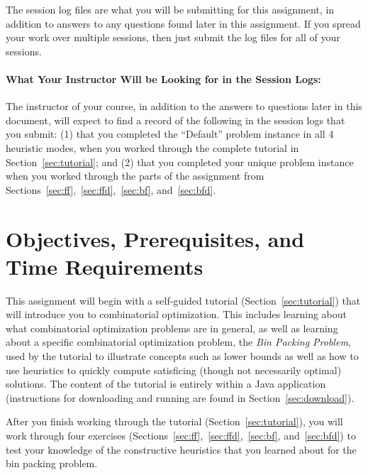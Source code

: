 \documentclass[11pt,letterpaper]{article}
\begin{document}
The session log files are what you will be submitting for this assignment,
in addition to answers to any questions found later in this assignment. If you
spread your work over multiple sessions, then just submit the log files for all
of your sessions.

\paragraph*{What Your Instructor Will be Looking for in the Session Logs:}
The instructor of your course, in addition to the answers to questions later in this
document, will expect to find a record of the following in the session logs that
you submit: (1) that you completed the ``Default'' problem instance in all 4
heuristic modes, when you worked through the complete tutorial in 
Section~\ref{sec:tutorial}; and (2) that you completed your unique problem instance
when you worked through the parts of the assignment from 
Sections~\ref{sec:ff},~\ref{sec:ffd},~\ref{sec:bf}, and~\ref{sec:bfd}.

\section{Objectives, Prerequisites, and Time Requirements}\label{sec:objectives}
This assignment will begin with a self-guided tutorial 
(Section~\ref{sec:tutorial}) that will introduce you to combinatorial 
optimization. This includes learning about what combinatorial optimization
problems are in general, as well as learning about a specific 
combinatorial optimization problem, the {\em Bin Packing Problem},
used by the tutorial to illustrate concepts such as lower bounds
as well as how to use heuristics to quickly compute satisficing
(though not necessarily optimal) solutions. The content of the tutorial
is entirely within a Java application (instructions for downloading
and running are found in Section~\ref{sec:download}).

After you finish working through the tutorial (Section~\ref{sec:tutorial}),
you will work through four exercises 
(Sections~\ref{sec:ff},~\ref{sec:ffd},~\ref{sec:bf}, and~\ref{sec:bfd}) 
to test your knowledge of the constructive heuristics that you learned 
about for the bin packing problem.
\end{document}
